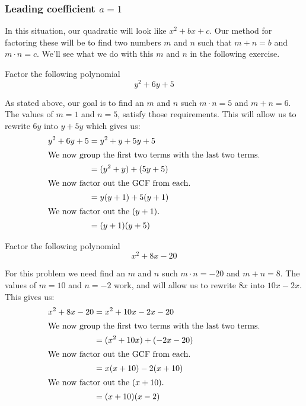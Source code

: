 \subsubsection*{Leading coefficient $a=1$}

In this situation, our quadratic will look like $x^2+bx+c$. Our method for factoring
these will be to find two numbers $m$ and $n$ such that $m+n=b$ and $m\cdot n=c$.
We'll see what we do with this $m$ and $n$ in the following exercise.



\begin{exercise}
Factor the following polynomial
\[
y^2+6y+5
\]
\end{exercise}
\begin{solution}[2.5in]
As stated above, our goal is to find an $m$ and $n$ such $m\cdot n=5$ and $m+n=6$.
The values of $m=1$ and $n=5$, satisfy those requirements. This will allow
us to rewrite $6y$ into $y+5y$ which gives us:
\begin{align*}
y^2+6y+5&=y^2+y+5y+5\\
\intertext{We now group the first two terms with the last two terms.}
&=(y^2+y)+(5y+5)\\
\intertext{We now factor out the GCF from each.}
&=y(y+1)+5(y+1)\\
\intertext{We now factor out the $(y+1)$.}
&=(y+1)(y+5)
\end{align*}
\end{solution}
\vspace{0.5em}

\begin{exercise}
Factor the following polynomial
\[
x^2+8x-20
\]
\end{exercise}
\begin{solution}[2.5in]
For this problem we need find an $m$ and $n$ such $m\cdot n=-20$ and $m+n=8$.
The values of $m=10$ and $n=-2$ work, and will allow
us to rewrite $8x$ into $10x-2x$. This gives us:
\begin{align*}
x^2+8x-20&=x^2+10x-2x-20\\
\intertext{We now group the first two terms with the last two terms.}
&=(x^2+10x)+(-2x-20)\\
\intertext{We now factor out the GCF from each.}
&=x(x+10)-2(x+10)\\
\intertext{We now factor out the $(x+10)$.}
&=(x+10)(x-2)
\end{align*}
\end{solution}
\vspace{0.5em}

